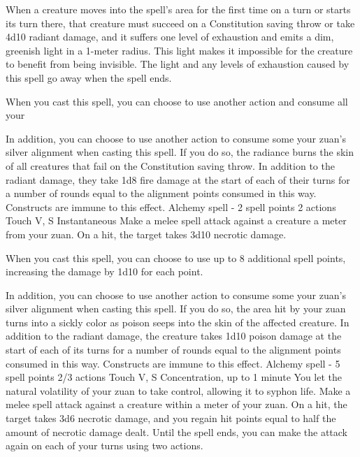         When a creature moves into the spell's area for the first time on a turn or starts its turn there, that creature must succeed on a Constitution saving throw or take 4d10 radiant damage, and it suffers one level of exhaustion and emits a dim, greenish light in a 1-meter radius.
        This light makes it impossible for the creature to benefit from being invisible.
        The light and any levels of exhaustion caused by this spell go away when the spell ends.

        When you cast this spell, you can choose to use another action and consume all your

        In addition, you can choose to use another action to consume some your zuan's silver alignment when casting this spell.
        If you do so, the radiance burns the skin of all creatures that fail on the Constitution saving throw.
        In addition to the radiant damage, they take 1d8 fire damage at the start of each of their turns for a number of rounds equal to the alignment points consumed in this way.
        Constructs are immune to this effect.
        {Alchemy spell - 2 spell points}
        {2 actions}
        {Touch}
        {V, S}
        {Instantaneous}
        Make a melee spell attack against a creature a meter from your zuan.
        On a hit, the target takes 3d10 necrotic damage.

        When you cast this spell, you can choose to use up to 8 additional spell points, increasing the damage by 1d10 for each point.

        In addition, you can choose to use another action to consume some your zuan's silver alignment when casting this spell.
        If you do so, the area hit by your zuan turns into a sickly color as poison seeps into the skin of the affected creature.
        In addition to the radiant damage, the creature takes 1d10 poison damage at the start of each of its turns for a number of rounds equal to the alignment points consumed in this way.
        Constructs are immune to this effect.
        {Alchemy spell - 5 spell points}
        {2/3 actions}
        {Touch}
        {V, S}
        {Concentration, up to 1 minute}
        You let the natural volatility of your zuan to take control, allowing it to syphon life.
        Make a melee spell attack against a creature within a meter of your zuan.
        On a hit, the target takes 3d6 necrotic damage, and you regain hit points equal to half the amount of necrotic damage dealt.
        Until the spell ends, you can make the attack again on each of your turns using two actions.

